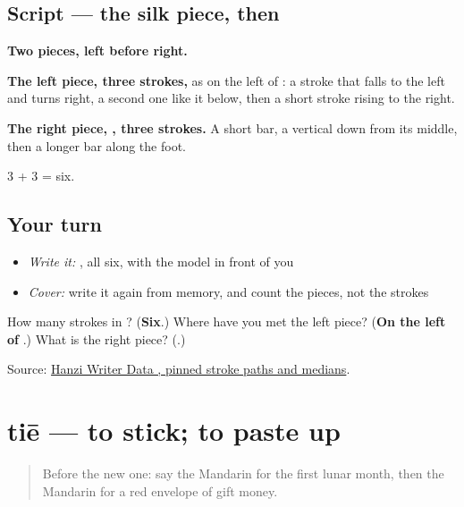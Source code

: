 \subsection*{Script — the silk piece, then }

\begin{quote}
\end{quote}

\textbf{Two pieces, left before right.}

\textbf{The left piece, three strokes,} as on the left of : a stroke that falls to the left and turns right, a second one like it below, then a short stroke rising to the right.

\textbf{The right piece, , three strokes.} A short bar, a vertical down from its middle, then a longer bar along the foot.

3 + 3 = six.

\subsection*{Your turn}
\begin{itemize}
\raggedright
  \item \emph{Write it:} , all six, with the model in front of you
  \item \emph{Cover:} write it again from memory, and count the pieces, not the strokes
\end{itemize}

\begin{tcolorbox}[breakable,colback=teal!4,colframe=teal!35!black,title={Before you move on}]
How many strokes in ? (\textbf{Six}.) Where have you met the left piece? (\textbf{On the left of }.) What is the right piece? (\textbf{}.)

Source: \href{https://raw.githubusercontent.com/chanind/hanzi-writer-data/68d10a4b21150cae5e1ebbd223eed289cf32d90c/data/\%E7\%BA\%A2.json}{Hanzi Writer Data , pinned stroke paths and medians}.
\end{tcolorbox}
\section[tiē]{tiē — to stick; to paste up}

\label{lesson:ZH-C334-tie}



\begin{quote}
Before the new one: say the Mandarin for the first lunar month, then the Mandarin for a red envelope of gift money.
\end{quote}

